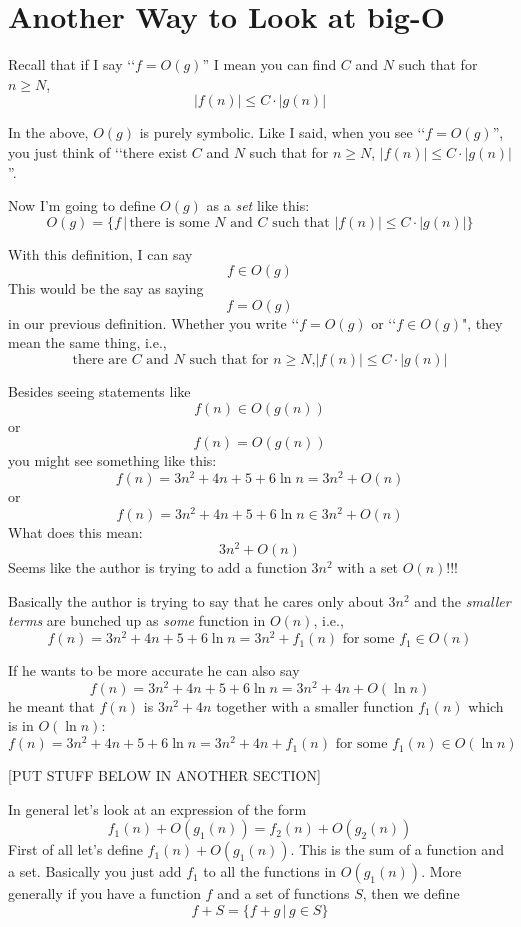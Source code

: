 \section{Another Way to Look at big-O}

Recall that if I say \lq\lq $f = O(g)$'' I mean
you can find $C$ and $N$ such that
for $n \geq N$,
\[
|f(n)| \leq C \cdot |g(n)|
\]

In the above, $O(g)$ is purely symbolic.
Like I said, when you see \lq\lq $f = O(g)$'',
you just think of
\lq\lq there exist $C$ and $N$ such that
for $n \geq N$,
$|f(n)| \leq C \cdot |g(n)|$''.

Now I'm going to define $O(g)$ as a \textit{set} like this:
\[
O(g) = 
\biggl\{
f \,\biggl|\,
\text{there is some $N$ and $C$ such that $|f(n)| \leq C\cdot |g(n)|$} 
\biggr\}
\]

With this definition, I can say
\[
f \in O(g)
\]
This would be the say as saying
\[
f = O(g)
\]
in our previous definition.
Whether you write \lq\lq $f = O(g)$ or
\lq\lq $f \in O(g)$", they mean the same thing, i.e.,
\[
\text{there are $C$ and $N$ such that for $n \geq N$,
$|f(n)| \leq C \cdot |g(n)|$}
\]

Besides seeing statements like
\[
f(n) \in O(g(n))
\]
or 
\[
f(n) = O(g(n))
\]
you might see something like this:
\[
   f(n) = 3n^2 + 4n + 5 + 6 \ln n = 3n^2 + O(n)
\]
or
\[
   f(n) = 3n^2 + 4n + 5 + 6 \ln n \in 3n^2 + O(n)
\]
What does this mean:
\[
3n^2 + O(n)
\]
Seems like the author is trying to add a
function $3n^2$ with a set $O(n)$!!!

Basically the author is trying
to say that he cares only about $3n^2$ and the \textit{smaller terms} are
bunched up as \textit{some} function in $O(n)$, i.e.,
\[
   f(n) = 3n^2 + 4n + 5 + 6 \ln n = 3n^2 + f_1(n) 
   \text{ for some $f_1 \in O(n)$}
\]

If he wants to be more
accurate he can also say
\[
  f(n) = 3n^2 + 4n + 5 + 6 \ln n = 3n^2 + 4n + O(\ln n)
\]
he meant that $f(n)$ is $3n^2 + 4n$ together with a smaller function
$f_1(n)$ which is in $O(\ln n)$:
\[
  f(n) = 3n^2 + 4n + 5 + 6 \ln n = 3n^2 + 4n + f_1(n) 
  \text{ for some $f_1(n) \in O(\ln n)$}
\]

[PUT STUFF BELOW IN ANOTHER SECTION]

In general let's look at an expression of the form
\[
  f_1(n) + O(g_1(n)) = f_2(n) + O(g_2(n))
\]
First of all let's define $f_1(n) + O(g_1(n))$. This is the sum of
a function and a set. Basically you just add $f_1$ to all the
functions in $O(g_1(n))$. More generally if you have a function
$f$ and a set of functions $S$, then we define
\[
 f + S = \{ f + g \,|\, g \in S \}
\]

